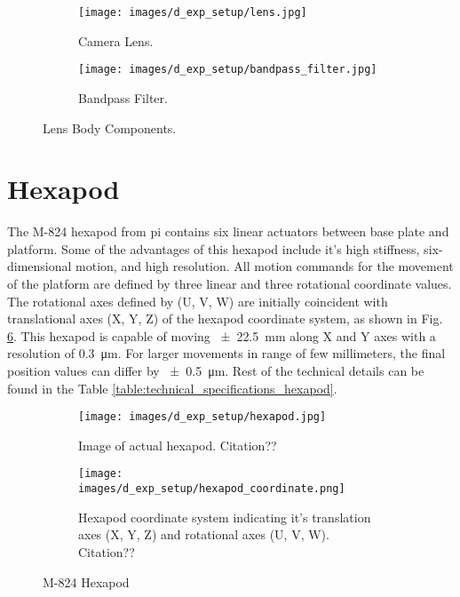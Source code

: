     \begin{figure}[h]
        \begin{subfigure}{0.5\textwidth}
            \centering
            \texttt{[image: images/d\_exp\_setup/lens.jpg]}
            \caption{Camera Lens. \cite{edmund_optics_lens}}
            \label{fig:lens.jpg}
        \end{subfigure}
        \begin{subfigure}{0.5\textwidth}
            \centering
            \texttt{[image: images/d\_exp\_setup/bandpass\_filter.jpg]}
            \caption{Bandpass Filter. \cite{thorlabs_bandpass_filter}}
            \label{fig:bandpass_filter.jpg}
        \end{subfigure}
        \caption{Lens Body Components.}
        \label{fig:lens_body.jpg}
    \end{figure}

\section*{Hexapod}
The M-824 hexapod from \gls{pi} contains six linear actuators between base plate and platform. Some of the advantages of this hexapod include it's high stiffness, six-dimensional motion, and high resolution. All motion commands for the movement of the platform are defined by three linear and three rotational coordinate values. The rotational axes defined by (U, V, W) are initially coincident with translational axes (X, Y, Z) of the hexapod coordinate system, as shown in Fig. \ref{fig:hexapod_coordinate.png}. This hexapod is capable of moving \SI{\pm22.5}{\milli\meter} along X and Y axes with a resolution of \SI{0.3}{\micro\meter}. For larger movements in range of few millimeters, the final position values can differ by \SI{\pm0.5}{\micro\meter}. Rest of the technical details can be found in the Table \ref{table:technical_specifications_hexapod}.

\begin{figure}[h]
    \begin{subfigure}{0.5\textwidth}
        \centering
        \texttt{[image: images/d\_exp\_setup/hexapod.jpg]}
        \caption{Image of actual hexapod. Citation??}
        \label{fig:hexapod.jpg}
    \end{subfigure}
    \begin{subfigure}{0.5\textwidth}
        \centering
        \texttt{[image: images/d\_exp\_setup/hexapod\_coordinate.png]}
        \caption{Hexapod coordinate system indicating it's translation axes (X, Y, Z) and rotational axes (U, V, W). Citation??}
        \label{fig:hexapod_coordinate.png}
    \end{subfigure}
    \caption{M-824 Hexapod}
\end{figure}

